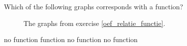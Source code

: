 \begin{Exercise}[difficulty = 1, label = oef_relatie_functie] Which of the following graphs corresponds with a function? 
\begin{figure}[H]
\centerline{
\hspace{0.1cm}
\hspace{0.1cm}
\hspace{0.1cm}
}
\caption{The graphs from exercise \ref{oef_relatie_functie}.}
\label{fig_functions_42}
\end{figure}
\end{Exercise}

\begin{Answer}\phantom{}
    \begin{multicols}{2}
	
		\Question no function
		\Question function
		\Question no function
		\Question no function
	\EndCurrentQuestion
    \end{multicols}
\end{Answer}


